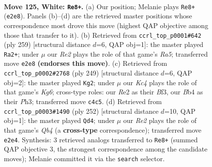 \documentclass[11pt]{article}
\begin{document}
\clearpage

\begin{figure}[p]\centering
\begin{subfigure}{0.46\textwidth}\centering
\resizebox{\linewidth}{!}{%
\newchessgame
\chessboard[
  setfen={7k/8/7r/8/1BK5/8/4R3/8 w - - 17 125},
  showmover=false,
  pgfstyle=straightmove, color=movearrow, markmove={e2-e8}
]}
\caption{}
\end{subfigure}\hfill
\begin{subfigure}{0.46\textwidth}\centering
\resizebox{\linewidth}{!}{%
\newchessgame
\chessboard[
  setfen={2R5/6k1/8/8/r7/8/2K5/8 b - - 5 130},
  showmover=false,
  pgfstyle=straightmove, color=movearrow, markmove={a4-a2}
]}
\caption{}
\end{subfigure}
\\[4pt]
\begin{subfigure}{0.46\textwidth}\centering
\resizebox{\linewidth}{!}{%
\newchessgame
\chessboard[
  setfen={3R4/8/8/8/8/5bkp/3K4/8 b - - 2 125},
  showmover=false,
  pgfstyle=straightmove, color=movearrow, markmove={g3-g2}
]}
\caption{}
\end{subfigure}\hfill
\begin{subfigure}{0.46\textwidth}\centering
\resizebox{\linewidth}{!}{%
\newchessgame
\chessboard[
  setfen={8/8/8/8/1Q6/3K4/k5r1/8 w - - 29 127},
  showmover=false,
  pgfstyle=straightmove, color=movearrow, markmove={b4-d4}
]}
\caption{}
\end{subfigure}
\caption{\textbf{Move 125, White: \texttt{Re8+}.} (a) Our position; Melanie plays \texttt{Re8+} (\texttt{e2e8}). Panels (b)--(d) are the retrieved master positions whose correspondence most drove this move (highest QAP objective among those that transfer to it). (b) Retrieved from \texttt{ccrl\_top\_p0001\#642} (ply 259) [structural distance $d$=6, QAP obj=1]: the master played \texttt{Ra2+}; under $\mu$ our \emph{Re2} plays the role of that game's \emph{Ra5}; transferred move \texttt{e2e8} \textbf{(endorses this move)}. (c) Retrieved from \texttt{ccrl\_top\_p0002\#2768} (ply 249) [structural distance $d$=6, QAP obj=2]: the master played \texttt{Kg2}; under $\mu$ our \emph{Kc4} plays the role of that game's \emph{Kg6}; cross-type roles: our \emph{R}e2 as their \emph{B}f3, our \emph{B}b4 as their \emph{P}h3; transferred move \texttt{c4c5}. (d) Retrieved from \texttt{ccrl\_top\_p0003\#1490} (ply 252) [structural distance $d$=10, QAP obj=1]: the master played \texttt{Qd4}; under $\mu$ our \emph{Re2} plays the role of that game's \emph{Qb4} (a \textbf{cross-type} correspondence); transferred move \texttt{e2e4}. Synthesis: 3 retrieved analogs transferred to \texttt{Re8+} (summed QAP objective 3, the strongest correspondence among the candidate moves); Melanie committed it via the \texttt{search} selector.}
\label{fig:thought-m248}
\end{figure}
\end{document}
